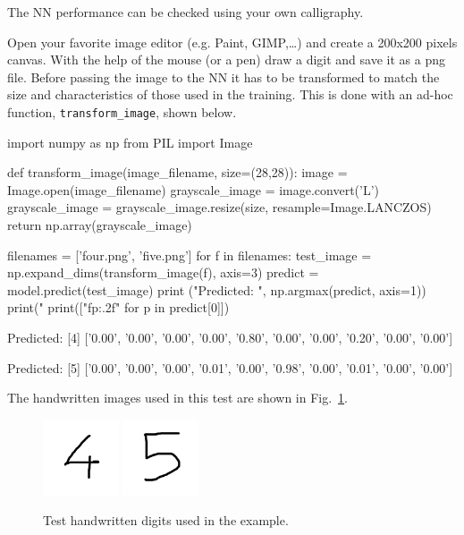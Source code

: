 The NN performance can be checked using your own calligraphy. 

Open your favorite image editor (e.g. Paint, GIMP,\ldots) and create a 200x200 pixels canvas. With the help of the mouse (or a pen) draw a digit and save it as a png file.
Before passing the image to the NN it has to be transformed to match the size and characteristics of those used in the training. This is done with an ad-hoc function, \texttt{transform\_image}, shown below.

\begin{ipythonnon}
import numpy as np
from PIL import Image

def transform_image(image_filename, size=(28,28)):
    image = Image.open(image_filename)
    grayscale_image = image.convert('L')
    grayscale_image = grayscale_image.resize(size, resample=Image.LANCZOS)
    return np.array(grayscale_image)

filenames = ['four.png', 'five.png']
for f in filenames:
    test_image = np.expand_dims(transform_image(f), axis=3)
    predict = model.predict(test_image)
    print ("Predicted: ", np.argmax(predict, axis=1))
    print("%
    print(["f{p:.2f}" for p in predict[0]])
\end{ipythonnon}
\begin{ioutput}
Predicted:  [4]
['0.00', '0.00', '0.00', '0.00', '0.80', '0.00', '0.00', '0.20', '0.00', 
'0.00']

Predicted:  [5]
['0.00', '0.00', '0.00', '0.01', '0.00', '0.98', '0.00', '0.01', '0.00', 
'0.00']
\end{ioutput}
The handwritten images used in this test are shown in Fig.~\ref{fig:test_images}.

\begin{figure}[htb]
\centering
\includegraphics[width=0.2\textwidth]{figures/four.png}
\includegraphics[width=0.2\textwidth]{figures/five.png}
\caption{Test handwritten digits used in the example.}
\label{fig:test_images}
\end{figure}

